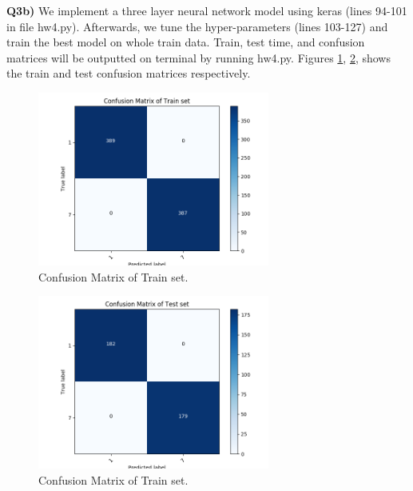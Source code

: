 \documentclass[12pt]{article}
\begin{document}
\textbf{Q3b)} We implement a three layer neural network model using keras (lines 94-101 in file hw4.py). Afterwards, we tune the hyper-parameters  (lines 103-127) and train the best model on whole train data. Train, test time, and confusion matrices will be outputted on terminal by running hw4.py. Figures \ref{fig:train}, \ref{fig:test}, shows the train and test confusion matrices respectively.\\

\begin{figure}[h] 
	\begin{center}
		\includegraphics[width=3in]{train.png}
		\caption{Confusion Matrix of Train set.}
		\label{fig:train}
	\end{center}
\end{figure}  
\begin{figure}[h] 
	\begin{center}
		\includegraphics[width=3in]{test.png}
		\caption{Confusion Matrix of Train set.}
		\label{fig:test}
	\end{center}
\end{figure}  
\end{document}
